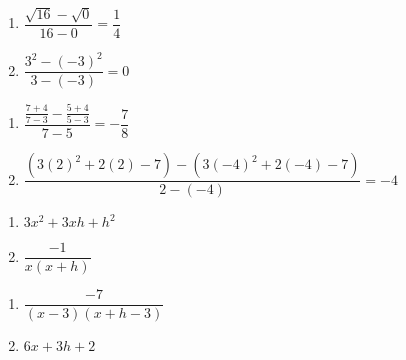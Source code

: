 \begin{multicols}{2}
\begin{enumerate}
\setcounter{enumi}{\value{HW}}


\item $\dfrac{\sqrt{16} - \sqrt{0}}{16 - 0} = \dfrac{1}{4}$
\item $\dfrac{3^{2} - (-3)^{2}}{3 - (-3)} = 0$

\setcounter{HW}{\value{enumi}}
\end{enumerate}
\end{multicols}

\begin{multicols}{2}
\begin{enumerate}
\setcounter{enumi}{\value{HW}}


\item $\dfrac{\frac{7 + 4}{7 - 3} - \frac{5 + 4}{5 - 3}}{7 - 5} = -\dfrac{7}{8}$ 
\item \scriptsize $\dfrac{(3(2)^{2}+2(2)-7)-(3(-4)^{2}+2(-4)-7)}{2-(-4)}=-4$ \normalsize



\setcounter{HW}{\value{enumi}}
\end{enumerate}
\end{multicols}

\begin{multicols}{2}
\begin{enumerate}
\setcounter{enumi}{\value{HW}}


\item $3x^{2} + 3xh + h^{2}$ 
\item $\dfrac{-1}{x(x + h)}$

\setcounter{HW}{\value{enumi}}
\end{enumerate}
\end{multicols}

\begin{multicols}{2}
\begin{enumerate}
\setcounter{enumi}{\value{HW}}


\item $\dfrac{-7}{(x - 3)(x + h - 3)}$
\item $6x + 3h + 2$ 

\setcounter{HW}{\value{enumi}}
\end{enumerate}
\end{multicols}

